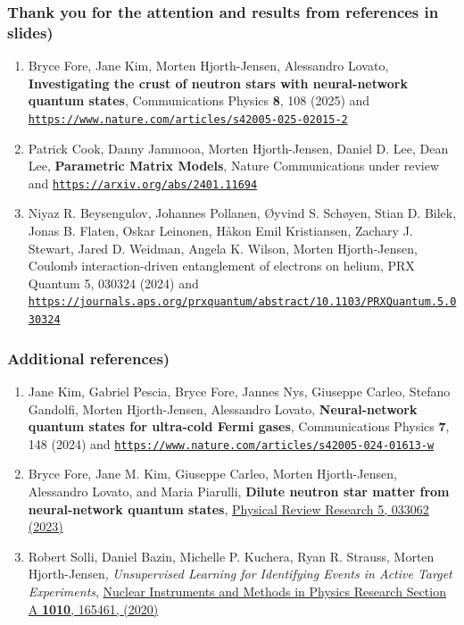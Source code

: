 \documentclass{beamer}
\begin{document}
\begin{frame}
\frametitle{Thank you for the attention and results from references in slides)}
\begin{enumerate}

\item Bryce Fore, Jane Kim, Morten Hjorth-Jensen, Alessandro Lovato, \textbf{Investigating the crust of neutron stars with neural-network quantum states}, Communications Physics \textbf{8}, 108  (2025) and \href{{https://www.nature.com/articles/s42005-025-02015-2}}{\nolinkurl{https://www.nature.com/articles/s42005-025-02015-2}}

\item Patrick Cook, Danny Jammooa, Morten Hjorth-Jensen, Daniel D. Lee, Dean Lee, \textbf{Parametric Matrix Models}, Nature Communications  under review and \href{{https://arxiv.org/abs/2401.11694}}{\nolinkurl{https://arxiv.org/abs/2401.11694}}

\item Niyaz R. Beysengulov, Johannes Pollanen, Øyvind S. Schøyen, Stian D. Bilek, Jonas B. Flaten, Oskar Leinonen, Håkon Emil Kristiansen, Zachary J. Stewart, Jared D. Weidman, Angela K. Wilson, Morten Hjorth-Jensen, Coulomb interaction-driven entanglement of electrons on helium, PRX Quantum 5, 030324 (2024) and \href{{https://journals.aps.org/prxquantum/abstract/10.1103/PRXQuantum.5.030324}}{\nolinkurl{https://journals.aps.org/prxquantum/abstract/10.1103/PRXQuantum.5.030324}}

\end{enumerate}
\end{frame}



\begin{frame}
\frametitle{Additional references)}
\begin{enumerate}

\item Jane Kim, Gabriel Pescia, Bryce Fore, Jannes Nys, Giuseppe Carleo, Stefano Gandolfi, Morten Hjorth-Jensen, Alessandro Lovato, \textbf{Neural-network quantum states for ultra-cold Fermi gases}, Communications Physics \textbf{7}, 148 (2024) and \href{{https://www.nature.com/articles/s42005-024-01613-w}}{\nolinkurl{https://www.nature.com/articles/s42005-024-01613-w}}

\item Bryce Fore, Jane M. Kim, Giuseppe Carleo, Morten Hjorth-Jensen, Alessandro Lovato, and Maria Piarulli, \textbf{Dilute neutron star matter from neural-network quantum states}, \href{{https://journals.aps.org/prresearch/abstract/10.1103/PhysRevResearch.5.033062}}{Physical Review  Research 5, 033062 (2023)}

\item Robert Solli, Daniel Bazin, Michelle P. Kuchera, Ryan R. Strauss, Morten Hjorth-Jensen, \emph{Unsupervised Learning for Identifying Events in Active Target Experiments}, \href{{https://www.sciencedirect.com/science/article/abs/pii/S0168900221004460}}{Nuclear Instruments and Methods in Physics Research Section A \textbf{1010}, 165461, (2020)}

\end{enumerate}
\end{frame}
\end{document}
